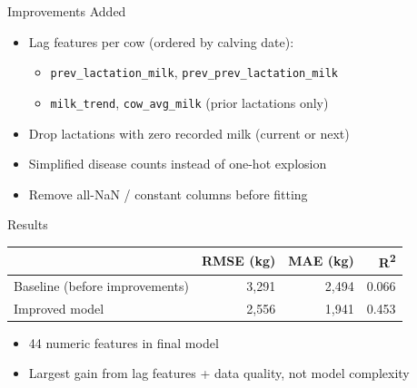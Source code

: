 \documentclass{beamer}
\begin{document}
\begin{frame}{Improvements Added}

\begin{itemize}
    \item Lag features per cow (ordered by calving date):
    \begin{itemize}
        \item \texttt{prev\_lactation\_milk}, \texttt{prev\_prev\_lactation\_milk}
        \item \texttt{milk\_trend}, \texttt{cow\_avg\_milk} (prior lactations only)
    \end{itemize}
    \item Drop lactations with zero recorded milk (current or next)
    \item Simplified disease counts instead of one-hot explosion
    \item Remove all-NaN / constant columns before fitting
\end{itemize}

\end{frame}

\begin{frame}{Results}

\small
\begin{center}
\begin{tabular}{l r r r}
\hline
 & \textbf{RMSE (kg)} & \textbf{MAE (kg)} & \textbf{R\textsuperscript{2}} \\
\hline
Baseline (before improvements) & 3,291 & 2,494 & 0.066 \\
Improved model                 & 2,556 & 1,941 & 0.453 \\
\hline
\end{tabular}
\end{center}

\vspace{0.4cm}

\begin{itemize}
    \item 44 numeric features in final model
    \item Largest gain from lag features + data quality, not model complexity
\end{itemize}

\end{frame}
\end{document}
